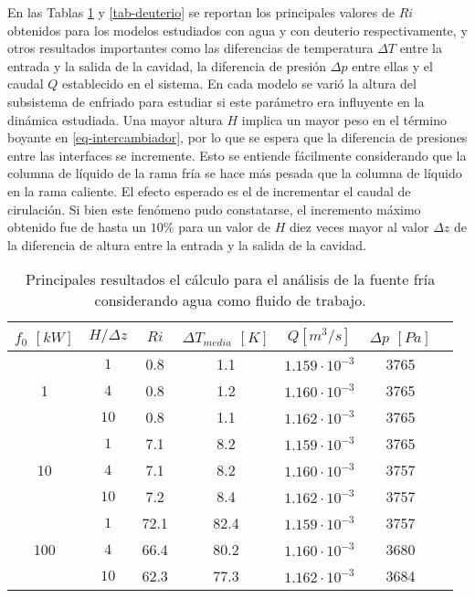 En las Tablas \ref{tab-agua} y \ref{tab-deuterio} se reportan los principales valores de $Ri$ obtenidos para los modelos estudiados con agua y con deuterio respectivamente,
y otros resultados importantes como las diferencias de temperatura $\Delta T$ entre la entrada y la salida de la cavidad,
la diferencia de presión $\Delta p$ entre ellas y el caudal $Q$ establecido en el sistema.
En cada modelo se varió la altura del subsistema de enfriado para estudiar si este parámetro era influyente en la dinámica estudiada.
Una mayor altura $H$ implica un mayor peso en el término boyante en \ref{eq-intercambiador}, por lo que se espera que la diferencia de presiones entre las interfaces se incremente.
Esto se entiende fácilmente considerando que la columna de líquido de la rama fría se hace más pesada que la columna de líquido en la rama caliente.
El efecto esperado es el de incrementar el caudal de cirulación.
Si bien este fenómeno pudo constatarse, el incremento máximo obtenido fue de hasta un $10\%$
para un valor de $H$ diez veces mayor al valor $\Delta z$ de la diferencia de altura entre la entrada y la salida de la cavidad.

\begin{table}[h!]
  \centering
  \begin{tabular}{ c c c c c c c } 
      \hline
      \multicolumn{1}{c}{$f_0$ $[kW]$} & \multicolumn{1}{c}{$H / \Delta z$} & \multicolumn{1}{c}{$Ri$} & \multicolumn{1}{c}{$\Delta T_{media}$ $[K]$} & \multicolumn{1}{c}{$Q$$[m^3/s]$}& \multicolumn{1}{c}{$\Delta p$ $[Pa]$} \\ \hline
      \multirow{3}{*}{1} & $1$ & 0.8 & 1.1 & $1.159 \cdot 10^{-3}$ & 3765 \\
                         & $4$ & 0.8 & 1.2 & $1.160 \cdot 10^{-3}$ & 3765 \\
                         & $10$ & 0.8 & 1.1 & $1.162 \cdot 10^{-3}$ & 3765 \\ \hline
      \multirow{3}{*}{10} & $1$ & 7.1 & 8.2 & $1.159 \cdot 10^{-3}$ & 3765 \\
                         & $4$ & 7.1 & 8.2 & $1.160 \cdot 10^{-3}$ & 3757 \\
                         & $10$ & 7.2 & 8.4 & $1.162 \cdot 10^{-3}$ & 3757 \\ \hline
      \multirow{3}{*}{100} & $1$ & 72.1 & 82.4 & $1.159 \cdot 10^{-3}$ & 3757 \\
                         & $4$ & 66.4 & 80.2 & $1.160 \cdot 10^{-3}$ & 3680 \\
                         & $10$ & 62.3 & 77.3 & $1.162 \cdot 10^{-3}$ & 3684 \\ \hline
   \end{tabular}   
   \caption[Principales resultados el cálculo para el análisis del sistema fluídico cerrado considerando agua como fluido de trabajo]
   {Principales resultados el cálculo para el análisis de la fuente fría considerando agua como fluido de trabajo.}
   \label{tab-agua}
\end{table}

